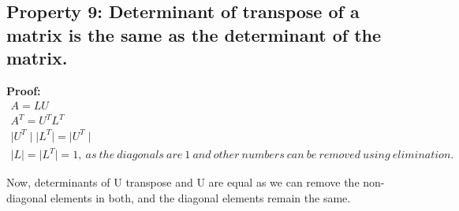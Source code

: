 \documentclass[]{article}
\begin{document}
\vspace{10pt}

\subsection{Property 9: Determinant of transpose of a matrix is the same as the determinant of the matrix.}

\vspace{10pt}

\noindent
\textbf{Proof:}\\

\noindent
\begin{equation*}
	\begin{split}
		A=LU\\
		A^T=U^TL^T\\
		\mid U^T \mid \mid L^T \mid = \mid U^T \mid\\
		\mid L \mid = \mid L^T \mid = 1,\ as \  the \ diagonals \  are \ 1 \  and \ other \  numbers \  can \ be \ removed \  using \ elimination.
	\end{split}
\end{equation*}

\noindent
Now, determinants of U transpose and U are equal as we can remove the non-diagonal elements in both, and the diagonal elements remain the same.\\
\end{document}
